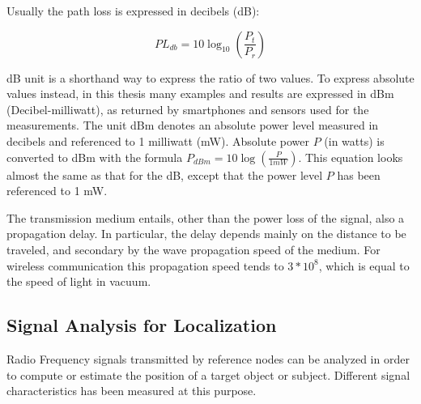 Usually the path loss is expressed in decibels (dB):

\begin{equation}\label{eq:path_loss_db}
PL_{db} = 10\log_{10}(\frac{P_t}{P_r})
\end{equation}

dB unit is a shorthand way to express the ratio of two values. To express absolute values instead, in this thesis many examples and results are expressed in dBm (Decibel-milliwatt), as returned by smartphones and sensors used for the measurements.
The unit dBm denotes an absolute power level measured in decibels and referenced to 1 milliwatt (mW). Absolute power $P$ (in watts) is converted to dBm with the formula $P_{dBm} = 10 \log (\frac{P}{1 mW})$. This equation looks almost the same as that for the dB, except that the power level $P$ has been referenced to 1 mW.

The transmission medium entails, other than the power loss of the signal, also a propagation delay. In particular, the delay depends mainly on the distance to be traveled, and secondary by the wave propagation speed of the medium. For wireless communication this propagation speed tends to $3*10^{8}$, which is equal to the speed of light in vacuum.

\subsection{Signal Analysis for Localization}
\label{subsec:sig_techniques}

Radio Frequency signals transmitted by reference nodes can be analyzed in order to compute or estimate the position of a target object or subject. Different signal characteristics has been measured at this purpose.

